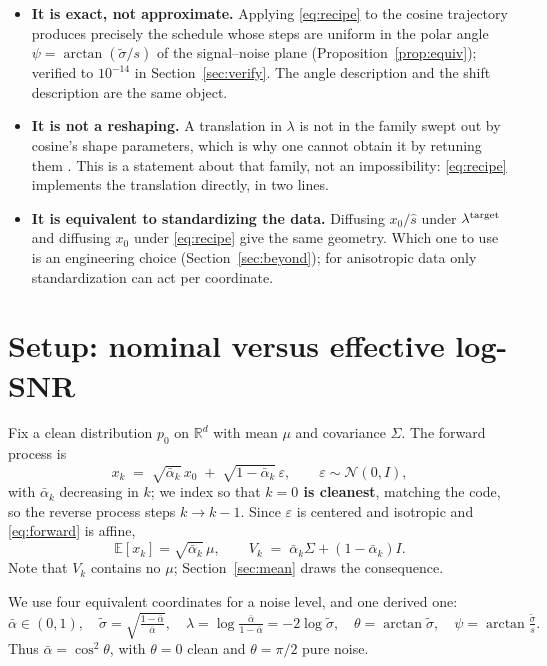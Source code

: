 \documentclass[11pt]{article}
\theoremstyle{definition}
\newcommand{\abar}{\bar\alpha}
\newcommand{\sig}{\tilde\sigma}
\newcommand{\R}{\mathbb{R}}
\newcommand{\E}{\mathbb{E}}
\begin{document}
\begin{itemize}\itemsep2pt
  \item \textbf{It is exact, not approximate.} Applying \eqref{eq:recipe} to the
  cosine trajectory produces precisely the schedule whose steps are uniform in
  the polar angle $\psi=\arctan(\sig/s)$ of the signal--noise plane
  (Proposition~\ref{prop:equiv}); verified to $10^{-14}$ in
  Section~\ref{sec:verify}. The angle description and the shift description are
  the same object.
  \item \textbf{It is not a reshaping.} A translation in $\lambda$ is not in the
  family swept out by cosine's shape parameters, which is why one cannot obtain
  it by retuning them \cite{chen2023importance}. This is a statement about that
  family, not an impossibility: \eqref{eq:recipe} implements the translation
  directly, in two lines.
  \item \textbf{It is equivalent to standardizing the data.} Diffusing $x_0/\hat s$
  under $\lambda^{\rm target}$ and diffusing $x_0$ under \eqref{eq:recipe} give
  the same geometry. Which one to use is an engineering choice
  (Section~\ref{sec:beyond}); for anisotropic data only standardization can act
  per coordinate.
\end{itemize}

\section{Setup: nominal versus effective log-SNR}
\label{sec:setup}

Fix a clean distribution $p_0$ on $\R^d$ with mean $\mu$ and covariance
$\Sigma$. The forward process is
\begin{equation}
  x_k \;=\; \sqrt{\abar_k}\,x_0 \;+\; \sqrt{1-\abar_k}\,\varepsilon,
  \qquad \varepsilon\sim\mathcal N(0,I),
  \label{eq:forward}
\end{equation}
with $\abar_k$ decreasing in $k$; we index so that \textbf{$k=0$ is cleanest},
matching the code, so the reverse process steps $k\to k-1$. Since $\varepsilon$
is centered and isotropic and \eqref{eq:forward} is affine,
\begin{equation}
  \E[x_k]=\sqrt{\abar_k}\,\mu,
  \qquad
  V_k \;=\; \abar_k\Sigma + (1-\abar_k)I .
  \label{eq:marginal}
\end{equation}
Note that $V_k$ contains no $\mu$; Section~\ref{sec:mean} draws the consequence.

We use four equivalent coordinates for a noise level, and one derived one:
\begin{equation}
  \abar\in(0,1),
  \quad
  \sig=\sqrt{\tfrac{1-\abar}{\abar}},
  \quad
  \lambda=\log\tfrac{\abar}{1-\abar}=-2\log\sig,
  \quad
  \theta=\arctan\sig,
  \quad
  \psi=\arctan\tfrac{\sig}{s}.
  \label{eq:coords}
\end{equation}
Thus $\abar=\cos^2\theta$, with $\theta=0$ clean and $\theta=\pi/2$ pure noise.
\end{document}
